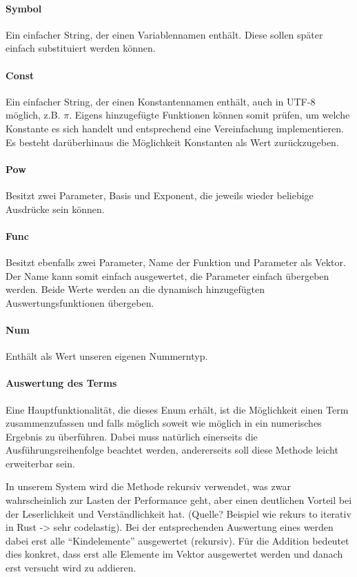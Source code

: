 \documentclass[11pt,a4paper, ngerman]{article}
\begin{document}
\paragraph{Symbol} Ein einfacher String, der einen Variablennamen enthält. Diese sollen später einfach substituiert werden können.

\paragraph{Const} Ein einfacher String, der einen Konstantennamen enthält, auch in UTF-8 möglich, z.B. $\pi$. Eigens hinzugefügte Funktionen können somit prüfen, um welche Konstante es sich handelt und entsprechend eine Vereinfachung implementieren. Es besteht darüberhinaus die Möglichkeit Konstanten als Wert zurückzugeben.

\paragraph{Pow} Besitzt zwei Parameter, Basis und Exponent, die jeweils wieder beliebige Ausdrücke sein können.

\paragraph{Func} Besitzt ebenfalls zwei Parameter, Name der Funktion und Parameter als Vektor. Der Name kann somit einfach ausgewertet, die Parameter einfach übergeben werden. Beide Werte werden an die dynamisch hinzugefügten Auswertungsfunktionen übergeben.

\paragraph{Num} Enthält als Wert unseren eigenen Nummerntyp.

\paragraph{Auswertung des Terms} Eine Hauptfunktionalität, die dieses Enum erhält, ist die Möglichkeit einen Term zusammenzufassen und falls möglich soweit wie möglich in ein numerisches Ergebnis zu überführen. Dabei muss natürlich einerseits die Ausführungsreihenfolge beachtet werden, andererseits soll diese Methode leicht erweiterbar sein.

In unserem System wird die Methode rekursiv verwendet, was zwar wahrscheinlich zur Lasten der Performance geht, aber einen deutlichen Vorteil bei der Leserlichkeit und Verständlichkeit hat. (Quelle? Beispiel wie rekurs to iterativ in Rust -> sehr codelastig). Bei der entsprechenden Auswertung eines  werden dabei erst alle ``Kindelemente'' ausgewertet (rekursiv). Für die Addition bedeutet dies konkret, dass erst alle Elemente im Vektor ausgewertet werden und danach erst versucht wird zu addieren.
\end{document}
